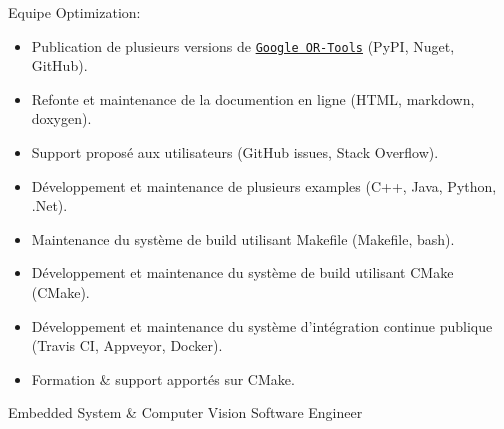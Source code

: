 \documentclass{article}
\begin{document}
\begin{llist}
{Equipe Optimization:
\vspace{-0.33cm}
\begin{itemize}
	\item Publication de plusieurs versions de
		\href{https://github.com/google/or-tools}{\texttt{Google OR-Tools}} (PyPI, Nuget, GitHub).
  \item Refonte et maintenance de la documention en ligne (HTML, markdown, doxygen).
  \item Support proposé aux utilisateurs (GitHub issues, Stack Overflow).
  \item D\'{e}veloppement et maintenance de plusieurs examples (C++, Java, Python, .Net).
  \item Maintenance du syst\`{e}me de build utilisant Makefile (Makefile, bash).
  \item D\'{e}veloppement et maintenance du syst\`{e}me de build utilisant CMake (CMake).
  \item D\'{e}veloppement et maintenance du syst\`{e}me d'int\'{e}gration continue publique (Travis CI, Appveyor, Docker).
  \item Formation \& support apportés sur CMake.
\end{itemize}
}

 {
Embedded System \& Computer Vision Software Engineer \\
\vspace{-0.33cm}

}
\end{llist}
\end{document}

